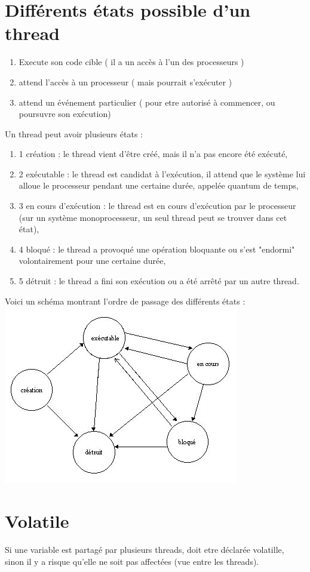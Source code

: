 \documentclass{article}
\begin{document}
\section{Différents états possible d'un thread}
\begin{enumerate}
\item Execute son code cible ( il a un accès à l'un des processeurs )
\item attend l'accès à un processeur ( mais pourrait s'exécuter )
\item attend un événement particulier ( pour etre autorisé à commencer, ou poursuvre son exécution)
\end{enumerate}
Un thread peut avoir plusieurs états :
\begin{enumerate}
\item{1} création : le thread vient d'être créé, mais il n'a pas encore été exécuté,
\item{2} exécutable : le thread est candidat à l'exécution, il attend que le système lui alloue le processeur pendant une certaine durée, appelée quantum de temps,
\item{3} en cours d'exécution : le thread est en cours d'exécution par le processeur (sur un système monoprocesseur, un seul thread peut se trouver dans cet état),
\item{4} bloqué : le thread a provoqué une opération bloquante ou s'est "endormi" volontairement pour une certaine durée,
\item{5} détruit : le thread a fini son exécution ou a été arrêté par un autre thread.
\end{enumerate}
Voici un schéma montrant l'ordre de passage des différents états :\\
\includegraphics{images/1.jpg}
\section{Volatile}
Si une variable est partagé par plusieurs threads, doit etre déclarée volatille, sinon il y a risque qu'elle ne soit pas affectées (vue entre les threads).
\end{document}
